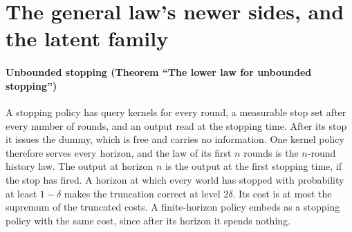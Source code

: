 


\section{The general law's newer sides, and the latent family}
\label{sec:newer}

\paragraph{Unbounded stopping (Theorem ``The lower law for unbounded stopping'')} A stopping
policy has query kernels for every round, a measurable stop set after every number of rounds, and
an output read at the stopping time. After its stop it issues the dummy, which is free and
carries no information. One kernel policy therefore serves every horizon, and the law of its
first $n$ rounds is the $n$-round history law. The output at horizon $n$ is the output at the
first stopping time, if the stop has fired. A horizon at which every world has stopped with
probability at least $1-\delta$ makes the truncation correct at level $2\delta$. Its cost is at most
the supremum of the truncated costs. A finite-horizon policy embeds as a stopping policy with the
same cost, since after its horizon it spends nothing.


